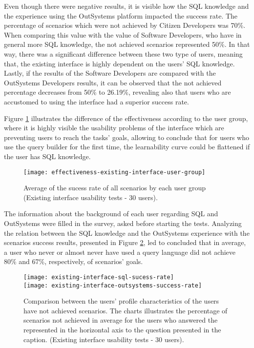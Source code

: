 Even though there were negative results, it is visible how the SQL knowledge and the experience using the OutSystems platform impacted the success rate. The percentage of scenarios which were not achieved by Citizen Developers was 70\%. When comparing this value with the value of Software Developers, who have in general more SQL knowledge, the not achieved scenarios represented 50\%. In that way, there was a significant difference between these two type of users, meaning that, the existing interface is highly dependent on the users' SQL knowledge. Lastly, if the results of the Software Developers are compared with the OutSystems Developers results, it can be observed that the not achieved percentage decreases from 50\% to 26.19\%, revealing also that users who are accustomed to using the interface had a superior success rate.

Figure \ref{fig:effectivenessExistingInterfaceUserGroup} illustrates the difference of the effectiveness according to the user group, where it is highly visible the usability problems of the interface which are preventing users to reach the tasks' goals, allowing to conclude that for users who use the query builder for the first time, the learnability curve could be flattened if the user has SQL knowledge.


\begin{figure}[htbp]
	\centering
	\texttt{[image: effectiveness-existing-interface-user-group]}
	\caption{Average of the sucess rate of all scenarios by each user group (Existing interface usability tests - 30 users).}
	\label{fig:effectivenessExistingInterfaceUserGroup}
\end{figure}

The information about the background of each user regarding SQL and OutSystems were filled in the survey, asked before starting the tests. Analyzing the relation between the SQL knowledge and the OutSystems experience with the scenarios success results, presented in Figure \ref{fig:existingInterfaceSqlOutsystemsSuccessRate}, led to concluded that in average, a user who never or almost never have used a query language did not achieve 80\% and 67\%, respectively, of scenarios' goals.

\begin{figure}[tb]
    \centering
      {\texttt{[image: existing-interface-sql-sucess-rate]}}%
      \\
      {\texttt{[image: existing-interface-outsystems-success-rate]}}%
    \caption{Comparison between the users' profile characteristics of the users have not achieved scenarios. The charts illustrates the percentage of scenarios not achieved in average for the users who answered the represented in the horizontal axis to the question presented in the caption. (Existing interface usability tests - 30 users). 
      }
    \label{fig:existingInterfaceSqlOutsystemsSuccessRate}
  \end{figure}

